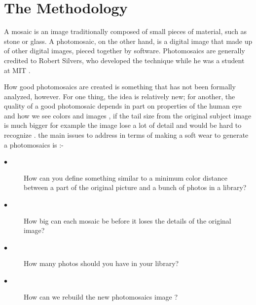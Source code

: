 \documentclass[a4paper,12pt]{report}
\begin{document}
	
	\chapter{The Methodology}
	
	A mosaic is an image traditionally composed of small pieces of material, such as stone or glass. A photomosaic, on the other hand, is a digital image that made up of other digital images, pieced together by software. Photomosaics are generally credited to Robert Silvers, who developed the technique while he was a student at MIT \cite{Robert}.
	
	How good photomosaics are created is something that has not been formally analyzed, however. For one thing, the idea is relatively new; for another, the quality of a good photomosaic depends in part on properties of the human eye and how we see colors and images , if the tail size from the original subject image is much bigger for example the image lose a lot of detail and would be hard to recognize . 
	the main issues to address in terms of making a soft wear to generate a photomosaics is :-
	\begin{description}
   \item[$\bullet$ ]	How can you define something similar to a minimum color distance between a part of the original picture and a bunch of photos in a library?
	
   \item[$\bullet$ ]	How big can each mosaic be before it loses the details of the original image?
	
   \item[$\bullet$ ]	How many photos should you have in your library?
	
   \item[$\bullet$ ]	How can we rebuild the new photomosaics image ?
   \end{description}

	
	
\end{document}
